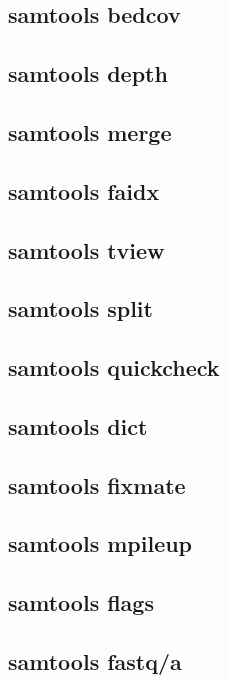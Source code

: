 \subsection{samtools bedcov}

\subsection{samtools depth}

\subsection{samtools merge}

\subsection{samtools faidx}

\subsection{samtools tview}

\subsection{samtools split}

\subsection{samtools quickcheck}

\subsection{samtools dict}

\subsection{samtools fixmate}

\subsection{samtools mpileup}

\subsection{samtools flags}

\subsection{samtools fastq/a}

